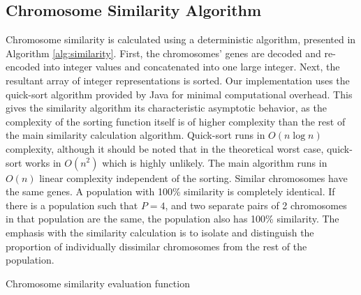 \documentclass[conference]{IEEEtran}
\begin{document}
\subsection{Chromosome Similarity Algorithm}
Chromosome similarity is calculated using a deterministic algorithm, presented in Algorithm \ref{alg:similarity}. First, the chromosomes' genes are decoded and re-encoded into integer values and concatenated into one large integer. Next, the resultant array of integer representations is sorted. Our implementation uses the quick-sort algorithm provided by Java for minimal computational overhead. This gives the similarity algorithm its characteristic asymptotic behavior, as the complexity of the sorting function itself is of higher complexity than the rest of the main similarity calculation algorithm. Quick-sort runs in $O(n \log n)$ complexity, although it should be noted that in the theoretical worst case, quick-sort works in $O(n^2)$ which is highly unlikely. The main algorithm runs in $O(n)$ linear complexity independent of the sorting. Similar chromosomes have the same genes. A population with 100\% similarity is completely identical. If there is a population such that $P = 4$, and two separate pairs of 2 chromosomes in that population are the same, the population also has 100\% similarity. The emphasis with the similarity calculation is to isolate and distinguish the proportion of individually dissimilar chromosomes from the rest of the population.

\begin{algorithm}
  \SetAlgoLined
  \DontPrintSemicolon
  
\caption{Chromosome similarity evaluation function}
\label{alg:similarity}
\end{algorithm}
\end{document}
